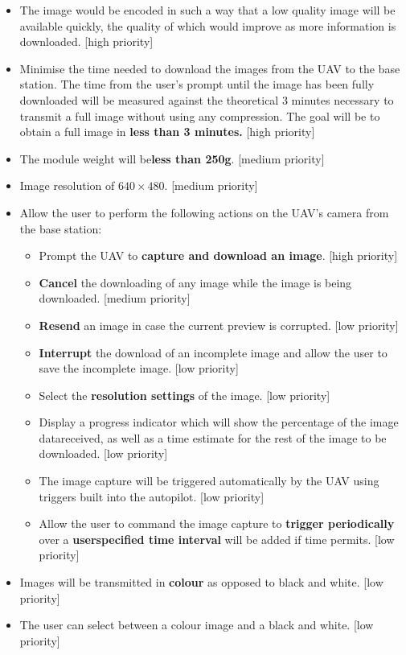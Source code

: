 \begin{itemize}
	\item The image would be encoded in such a way that a low quality image will be available quickly, the quality of which would improve as more information is downloaded. [high priority]
	\item Minimise the time needed to download the images from the UAV to the base station. The time from the user’s prompt until the image has been fully downloaded will be measured against the theoretical 3 minutes necessary to transmit a full image without using any compression. The goal will be to obtain a full image in \textbf{less than 3 minutes.} [high priority]
	\item The module weight will be\textbf{less than 250g}. [medium priority]
	\item Image resolution of \textbf{$640\times480$}. [medium priority]
	\item Allow the user to perform the following actions on the UAV’s camera from the base station:
	\begin{itemize}
		\item Prompt the UAV to \textbf{capture and download an image}. [high priority]
		\item \textbf{Cancel} the downloading of any image while the image is being downloaded. [medium priority]
		\item \textbf{Resend} an image in case the current preview is corrupted. [low priority]
		\item \textbf{Interrupt} the download of an incomplete image and allow the user to save the incomplete image. [low priority]
		\item Select the \textbf{resolution settings} of the image. [low priority]
		\item Display a progress indicator which will show the percentage of the image datareceived, as well as a time estimate for the rest of the image to be downloaded. [low priority]
		\item The image capture will be triggered automatically by the UAV using triggers built into the autopilot. [low priority]
		\item Allow the user to command the image capture to \textbf{trigger periodically} over a \textbf{userspecified time interval} will be added if time permits. [low priority]
	\end{itemize}
	\item Images will be transmitted in \textbf{colour} as opposed to black and white. [low priority]
	\item The user can select between a colour image and a black and white. [low priority]
\end{itemize}


